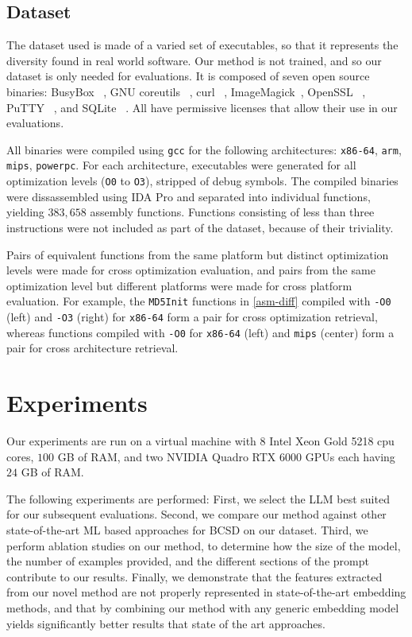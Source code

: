 \subsection{Dataset}

The dataset used is made of a varied set of executables, so that it represents the diversity found in real world software.
Our method is not trained, and so our dataset is only needed for evaluations. It is composed of seven open source binaries:
BusyBox ~\cite{busybox}, GNU coreutils ~\cite{coreutils}, curl ~\cite{curl}, ImageMagick~\cite{image-magick}, OpenSSL ~\cite{openssl},
PuTTY ~\cite{putty}, and SQLite ~\cite{sqlite}. All have permissive licenses that allow their use in our evaluations. 

All binaries were compiled using \texttt{gcc} for the following architectures: \texttt{x86-64}, \texttt{arm}, \texttt{mips}, \texttt{powerpc}.
For each architecture, executables were generated for all optimization levels (\texttt{O0} to \texttt{O3}), stripped of debug symbols.
The compiled binaries were dissassembled using IDA Pro and separated into individual functions, yielding \(383,658\) assembly functions.
Functions consisting of less than three instructions were not included as part of the dataset, because of their triviality.

Pairs of equivalent functions from the same platform but distinct optimization levels were made for cross optimization
evaluation, and pairs from the same optimization level but different platforms were made for cross
platform evaluation. For example, the \texttt{MD5Init} functions in \autoref{asm-diff} compiled with \texttt{-O0} (left) and
\texttt{-O3} (right) for \texttt{x86-64} form a pair for cross optimization retrieval, whereas functions compiled with \texttt{-O0}
for \texttt{x86-64} (left) and \texttt{mips} (center) form a pair for cross architecture retrieval.

\section{Experiments}

Our experiments are run on a virtual machine with 8 Intel Xeon Gold 5218 cpu cores, \(100\) GB of RAM, and two NVIDIA Quadro RTX
6000 GPUs each having  \(24\) GB of RAM.

The following experiments are performed: First, we select the LLM best suited for our subsequent evaluations. Second, we compare our
method against other state-of-the-art ML based approaches for BCSD on our dataset. Third, we perform ablation studies on our method,
to determine how the size of the model, the number of examples provided, and the different sections of the prompt contribute to our results.
Finally, we demonstrate that the features extracted from our novel method are not properly represented in state-of-the-art embedding methods,
and that by combining our method with any generic embedding model yields significantly better results that state of the art approaches.

